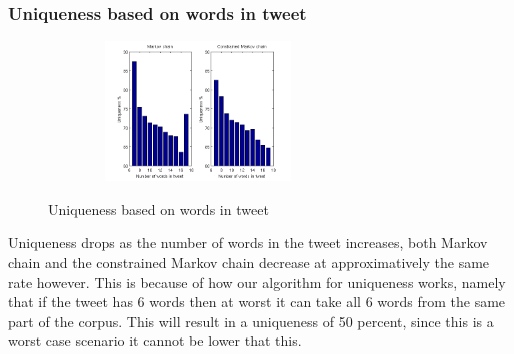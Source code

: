\documentclass[a4paper,12pt]{article}
\begin{document}
\subsubsection{Uniqueness based on words in tweet}

\begin{figure}[h!]
  \hfill
  \begin{center}
  	{\includegraphics[width=300, height = 140]{UniqByNumWordsTweet.png}}
  \end{center}
  \caption{Uniqueness based on words in tweet}
 \end{figure}
 
 Uniqueness drops as the number of words in the tweet increases, both Markov chain and the constrained Markov chain decrease at  approximatively the same rate however. This is because of how our algorithm for uniqueness works, namely that if the tweet has 6 words then at worst it can take all 6 words from the same part of the corpus. This will result in a uniqueness of 50 percent, since this is a worst case scenario it cannot be lower that this.
 
\end{document}
